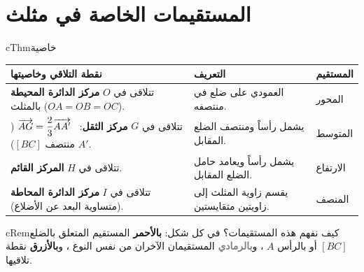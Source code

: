\documentclass[12pt,a4paper]{article}
\newenvironment{BOX}[2]{\begin{otherlanguage}{english}\begin{arbox}{#1}{#2}}{\end{arbox}\end{otherlanguage}}
\newenvironment{khassia}[1][خاصية]{\begin{BOX}{cThm}{#1}}{\end{BOX}}
\newenvironment{molahada}[1][ملاحظة]{\begin{BOX}{cRem}{#1}}{\end{BOX}}
\begin{document}
\section{المستقيمات الخاصة في مثلث}
\begin{khassia}
\renewcommand{\arraystretch}{1.5}
\centering
\begin{tabular}{|p{}|p{}|p{}|}\hline
\cellcolor{cThm!15}\textbf{نقطة التلاقي وخاصيتها} & \cellcolor{cThm!15}\textbf{التعريف} & \cellcolor{cThm!15}\textbf{المستقيم}\\\hline
تتلاقى في $O$ \textbf{مركز الدائرة المحيطة} بالمثلث ($OA=OB=OC$). & العمودي على ضلع في منتصفه. & المحور\\\hline
تتلاقى في $G$ \textbf{مركز الثقل}: \ $\overrightarrow{AG}=\dfrac23\overrightarrow{AA'}$ ($A'$ منتصف $[BC]$). & يشمل رأساً ومنتصف الضلع المقابل. & المتوسط\\\hline
تتلاقى في $H$ \textbf{المركز القائم}. & يشمل رأساً ويعامد حامل الضلع المقابل. & الارتفاع\\\hline
تتلاقى في $I$ \textbf{مركز الدائرة المحاطة} (متساوية البعد عن الأضلاع). & يقسم زاوية المثلث إلى زاويتين متقايستين. & المنصف\\\hline
\end{tabular}
\end{khassia}
\begin{molahada}[كيف نفهم هذه المستقيمات؟]
في كل شكل: \textcolor{cThm}{\textbf{بالأحمر}} المستقيم المتعلق بالضلع $[BC]$ أو بالرأس $A$ ، و\textcolor{gray}{\textbf{بالرمادي}} المستقيمان الآخران من نفس النوع ، و\textcolor{cDef}{\textbf{بالأزرق}} نقطة تلاقيها.
\end{molahada}
\end{document}
